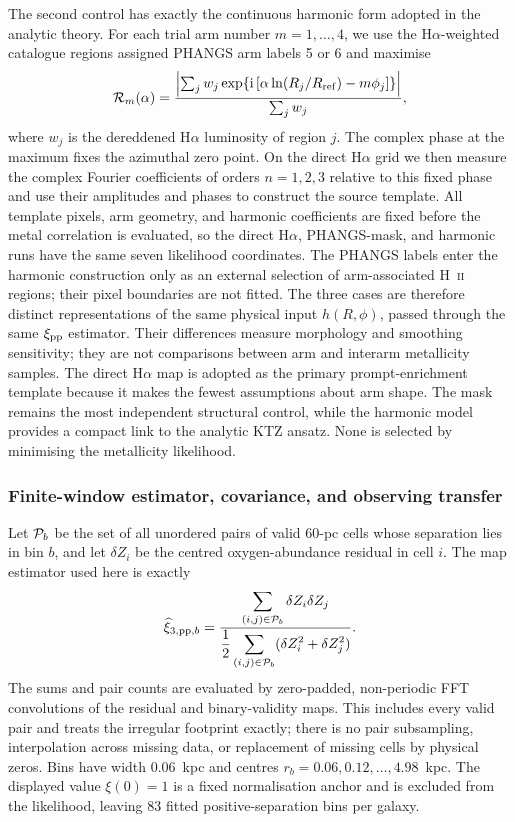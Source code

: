 \documentclass[fleqn,usenatbib]{mnras}
\begin{document}
The second control has exactly the continuous harmonic form adopted in the analytic theory.  For each trial arm number $m=1,\ldots,4$, we use the H$\alpha$-weighted catalogue regions assigned PHANGS arm labels 5 or 6 and maximise
\begin{equation}
    {\cal R}_m(\alpha)=
    \frac{\left|\sum_j w_j
    \exp\!\left\{\mathrm{i}\left[
    \alpha\ln(R_j/R_{\rm ref})-m\phi_j\right]\right\}\right|}
    {\sum_j w_j},
    \label{eq:phangs_logspiral_coherence}
\end{equation}
where $w_j$ is the dereddened H$\alpha$ luminosity of region $j$.  The complex phase at the maximum fixes the azimuthal zero point.  On the direct H$\alpha$ grid we then measure the complex Fourier coefficients of orders $n=1,2,3$ relative to this fixed phase and use their amplitudes and phases to construct the source template.  All template pixels, arm geometry, and harmonic coefficients are fixed before the metal correlation is evaluated, so the direct H$\alpha$, PHANGS-mask, and harmonic runs have the same seven likelihood coordinates.  The PHANGS labels enter the harmonic construction only as an external selection of arm-associated H~\textsc{ii} regions; their pixel boundaries are not fitted.  The three cases are therefore distinct representations of the same physical input $h(R,\phi)$, passed through the same $\xi_{{\rm pp}}$ estimator.  Their differences measure morphology and smoothing sensitivity; they are not comparisons between arm and interarm metallicity samples.  The direct H$\alpha$ map is adopted as the primary prompt-enrichment template because it makes the fewest assumptions about arm shape.  The mask remains the most independent structural control, while the harmonic model provides a compact link to the analytic KTZ ansatz.  None is selected by minimising the metallicity likelihood.

\subsubsection{Finite-window estimator, covariance, and observing transfer}
\label{sssec:phangs_statistic}

Let ${\cal P}_b$ be the set of all unordered pairs of valid 60-pc cells whose separation lies in bin $b$, and let $\delta Z_i$ be the centred oxygen-abundance residual in cell $i$.  The map estimator used here is exactly
\begin{equation}
    \widehat\xi_{3,{\rm pp},b}=
    \frac{\displaystyle\sum_{(i,j)\in{\cal P}_b}\delta Z_i\delta Z_j}
    {\displaystyle\frac{1}{2}
    \sum_{(i,j)\in{\cal P}_b}(\delta Z_i^2+\delta Z_j^2)}.
    \label{eq:phangs_pair_estimator}
\end{equation}
The sums and pair counts are evaluated by zero-padded, non-periodic FFT convolutions of the residual and binary-validity maps.  This includes every valid pair and treats the irregular footprint exactly; there is no pair subsampling, interpolation across missing data, or replacement of missing cells by physical zeros.  Bins have width 0.06~kpc and centres $r_b=0.06,0.12,\ldots,4.98$~kpc.  The displayed value $\xi(0)=1$ is a fixed normalisation anchor and is excluded from the likelihood, leaving 83 fitted positive-separation bins per galaxy.
\end{document}
